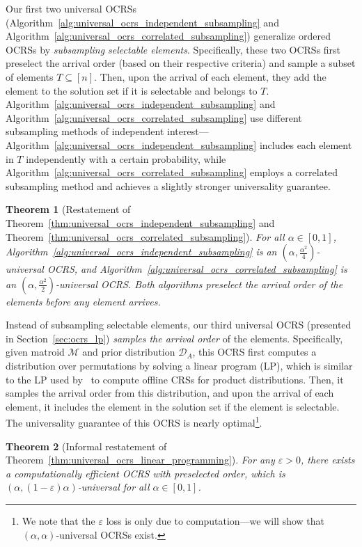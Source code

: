 \documentclass[11pt]{article}
\newcommand{\D}{\mathcal D}
\newcommand{\M}{{\mathcal M}}
\newcommand{\eps}{\varepsilon}
\newtheorem{theorem}{Theorem}[section]
\begin{document}
Our first two universal OCRSs (Algorithm~\ref{alg:universal_ocrs_independent_subsampling} and Algorithm~\ref{alg:universal_ocrs_correlated_subsampling}) generalize ordered OCRSs by \emph{subsampling selectable elements}. Specifically, these two OCRSs first preselect the arrival order (based on their respective criteria) and sample a subset of elements $T\subseteq[n]$. Then, upon the arrival of each element, they add the element to the solution set if it is selectable and belongs to $T$. Algorithm~\ref{alg:universal_ocrs_independent_subsampling} and Algorithm~\ref{alg:universal_ocrs_correlated_subsampling} use different subsampling methods of independent interest---Algorithm~\ref{alg:universal_ocrs_independent_subsampling} includes each element in $T$ independently with a certain probability, while Algorithm~\ref{alg:universal_ocrs_correlated_subsampling} employs a correlated subsampling method and achieves a slightly stronger universality guarantee.
\begin{theorem}[Restatement of Theorem~\ref{thm:universal_ocrs_independent_subsampling} and Theorem~\ref{thm:universal_ocrs_correlated_subsampling}]
For all $\alpha\in[0,1]$, Algorithm~\ref{alg:universal_ocrs_independent_subsampling} is an $(\alpha,\frac{\alpha^2}{4})$-universal OCRS, and Algorithm~\ref{alg:universal_ocrs_correlated_subsampling}
is an $(\alpha,\frac{\alpha^2}{2})$-universal OCRS. Both algorithms preselect the arrival order of the elements before any element arrives.
\end{theorem}

Instead of subsampling selectable elements, our third universal OCRS (presented in Section~\ref{sec:ocrs_lp}) \emph{samples the arrival order} of the elements. Specifically, given matroid $\M$ and prior distribution $\D_A$, this OCRS first computes a distribution over permutations by solving a linear program (LP), which is similar to the LP used by~\citet{chekuri2014submodular} to compute offline CRSs for product distributions. Then, it samples the arrival order from this distribution, and upon the arrival of each element, it includes the element in the solution set if the element is selectable. The universality guarantee of this OCRS is nearly optimal\footnote{We note that the $\eps$ loss is only due to computation---we will show that $(\alpha,\alpha)$-universal OCRSs exist.}.
\begin{theorem}[Informal restatement of Theorem~\ref{thm:universal_ocrs_linear_programming}]
For any $\eps>0$, there exists a computationally efficient OCRS with preselected order, which is $(\alpha,(1-\eps)\alpha)$-universal for all $\alpha\in[0,1]$.
\end{theorem}
\end{document}
